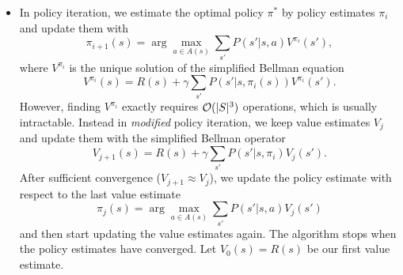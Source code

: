 \documentclass[11pt, a4paper]{article}
\begin{document}
\begin{enumerate}
\begin{solution}
\begin{itemize}
            \item In policy iteration, we estimate the optimal policy $\pi^*$ by policy estimates $\pi_i$ and update them with
            \begin{equation*}
                \pi_{i+1}(s) = \arg \max_{a \in A(s)} \sum_{s'} P(s' | s, a) V^{\pi_i}(s'),
            \end{equation*}
            where $V^{\pi_i}$ is the unique solution of the simplified Bellman equation
            \begin{equation*}
                V^{\pi_i}(s) = R(s) + \gamma \sum_{s'} P(s' | s, \pi_i(s)) V^{\pi_i}(s') .
            \end{equation*}
            However, finding $V^{\pi_i}$ exactly requires $\mathcal{O}(\lvert S\rvert^3)$ operations, which is usually intractable. Instead in \emph{modified} policy iteration, we keep value estimates $V_j$ and update them with the simplified Bellman operator
            \begin{equation*}
                V_{j + 1}(s) = R(s) + \gamma \sum_{s'} P(s' | s, \pi_i) V_j(s') .
            \end{equation*}
            After sufficient convergence ($V_{j+1} \approx V_{j}$), we update the policy estimate with respect to the last value estimate
            \begin{equation*}
                \pi_j(s) = \arg \max_{a \in A(s)} \sum_{s'} P(s' | s, a) V_j(s')
            \end{equation*}
            and then start updating the value estimates again. The algorithm stops when the policy estimates have converged. Let $V_0(s) = R(s)$ be our first value estimate.


\end{itemize}
\end{solution}
\end{enumerate}
\end{document}
